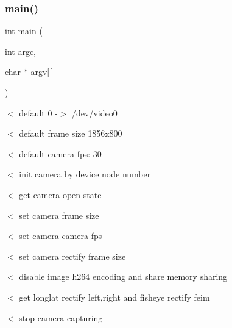 \subsubsection{main()}
{\footnotesize\ttfamily int main (\begin{DoxyParamCaption}\item[{int}]{argc,  }\item[{char $\ast$}]{argv[$\,$] }\end{DoxyParamCaption})}

$<$ default 0 -\/$>$ /dev/video0

$<$ default frame size 1856x800

$<$ default camera fps\+: 30

$<$ init camera by device node number

$<$ get camera open state

$<$ set camera frame size

$<$ set camera camera fps

$<$ set camera rectify frame size

$<$ disable image h264 encoding and share memory sharing

$<$ get longlat rectify left,right and fisheye rectify feim

$<$ stop camera capturing 